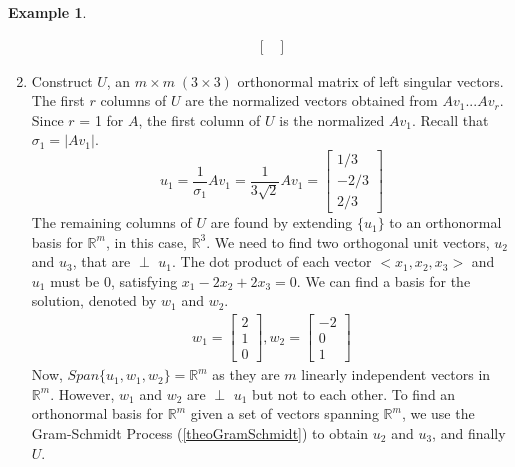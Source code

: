 \documentclass[12pt, reqno]{amsart}
\theoremstyle{definition}
\newtheorem{example}[theorem]{Example}
\theoremstyle{remark}
\numberwithin{equation}{section}
\begin{document}
\begin{example}
\begin{enumerate}
\begin{equation}
\begin{split}
\begin{bmatrix}
                    \end{bmatrix}
                \end{split}
            \end{equation}
        \item Construct $U$, an $m \times m \; (3 \times 3)$  orthonormal matrix of left singular vectors. The first $r$ columns of $U$ are the normalized vectors obtained from $Av_1...Av_r$. Since $r$ = 1 for $A$, the first column of $U$ is the normalized $Av_1$. Recall that $\sigma_1 = |Av_1|$.
            \begin{equation}
                u_1 = \frac{1}{\sigma_1}Av_1 
                = \frac{1}{3\sqrt{2}}Av_1
                = \begin{bmatrix}
                    1/3\\
                    -2/3\\
                    2/3
                \end{bmatrix}
            \end{equation}
        The remaining columns of $U$ are found by extending $\{u_1\}$ to an orthonormal basis for $\mathbb{R}^m$, in this case, $\mathbb{R}^3$. We need to find two orthogonal unit vectors, $u_2$ and $u_3$, that are $\perp$ $u_1$. The dot product of each vector $<x_1, x_2, x_3>$ and $u_1$ must be 0, satisfying $x_1 - 2x_2 + 2x_3 = 0$. We can find a basis for the solution, denoted by $w_1$ and $w_2$.
            \begin{equation}
                \begin{split}
                    w_1 = \begin{bmatrix}
                        2\\
                        1\\
                        0
                    \end{bmatrix},
                    w_2 = \begin{bmatrix}
                        -2\\
                        0\\
                        1
                    \end{bmatrix}
                \end{split}
            \end{equation}
        Now, $Span \{u_1, w_1, w_2\} = \mathbb{R}^m$ as they are $m$ linearly independent vectors in $\mathbb{R}^m$. However, $w_1$ and $w_2$ are $\perp$ $u_1$ but not to each other. To find an orthonormal basis for $\mathbb{R}^m$ given a set of vectors spanning $\mathbb{R}^m$, we use the Gram-Schmidt Process (\ref{theoGramSchmidt}) to obtain $u_2$ and $u_3$, and finally $U$.

\end{enumerate}
\end{example}
\end{document}
